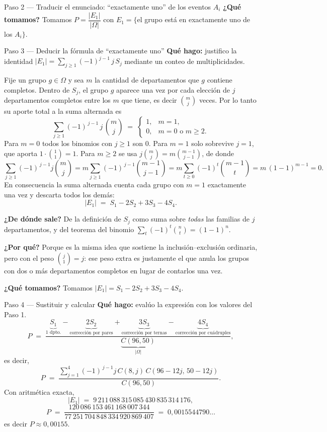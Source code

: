 \documentclass[11pt]{article}
\begin{document}
\begin{sol}
\begin{paso}{Paso 2 --- Traducir el enunciado: ``exactamente uno'' de los eventos $A_i$}
\textbf{¿Qu\'e tomamos?} Tomamos $P=\dfrac{|E_1|}{|\Omega|}$ con $E_1=\{$el grupo est\'a en exactamente uno de los $A_i\}$.
\end{paso}

\begin{paso}{Paso 3 --- Deducir la f\'ormula de ``exactamente uno''}
\textbf{Qu\'e hago:} justifico la identidad $|E_1|=\sum_{j\ge 1}(-1)^{j-1}\,j\,S_j$ mediante un conteo de multiplicidades.

Fije un grupo $g\in\Omega$ y sea $m$ la cantidad de departamentos que $g$ contiene completos. Dentro de $S_j$, el grupo $g$ aparece una vez por cada elecci\'on de $j$ departamentos completos entre los $m$ que tiene, es decir $\binom{m}{j}$ veces. Por lo tanto su aporte total a la suma alternada es
\[
\sum_{j\ge 1}(-1)^{\,j-1}\,j\,\binom{m}{j}
\;=\;\begin{cases} 1, & m=1,\\[2pt] 0, & m=0 \text{ o } m\ge 2.\end{cases}
\]
Para $m=0$ todos los binomios con $j\ge1$ son $0$. Para $m=1$ solo sobrevive $j=1$, que aporta $1\cdot\binom{1}{1}=1$. Para $m\ge 2$ se usa $j\binom{m}{j}=m\binom{m-1}{j-1}$, de donde
\[
\sum_{j\ge 1}(-1)^{\,j-1}j\binom{m}{j}=m\sum_{j\ge 1}(-1)^{\,j-1}\binom{m-1}{j-1}=m\sum_{t\ge 0}(-1)^{t}\binom{m-1}{t}=m\,(1-1)^{m-1}=0 .
\]
En consecuencia la suma alternada cuenta cada grupo con $m=1$ exactamente una vez y descarta todos los dem\'as:
\[
|E_1| \;=\; S_1-2S_2+3S_3-4S_4 .
\]

\textbf{¿De d\'onde sale?} De la definici\'on de $S_j$ como suma sobre \emph{todas} las familias de $j$ departamentos, y del teorema del binomio $\sum_t(-1)^t\binom{n}{t}=(1-1)^n$.

\textbf{¿Por qu\'e?} Porque es la misma idea que sostiene la inclusi\'on--exclusi\'on ordinaria, pero con el peso $\binom{j}{1}=j$: ese peso extra es justamente el que anula los grupos con dos o m\'as departamentos completos en lugar de contarlos una vez.

\textbf{¿Qu\'e tomamos?} Tomamos $|E_1|=S_1-2S_2+3S_3-4S_4$.
\end{paso}

\begin{paso}{Paso 4 --- Sustituir y calcular}
\textbf{Qu\'e hago:} evalúo la expresi\'on con los valores del Paso 1.
\[
P \;=\;\frac{\underbrace{S_1}_{\text{1 dpto.}}-\underbrace{2S_2}_{\text{correcci\'on por pares}}+\underbrace{3S_3}_{\text{correcci\'on por ternas}}-\underbrace{4S_4}_{\text{correcci\'on por cu\'adruples}}}{\underbrace{C(96,50)}_{|\Omega|}} ,
\]
es decir,
\[
P \;=\;\frac{\displaystyle\sum_{j=1}^{4}(-1)^{\,j-1}j\,C(8,j)\,C(96-12j,\,50-12j)}{C(96,50)} .
\]
Con aritm\'etica exacta,
\[
|E_1| \;=\; 9\,211\,088\,315\,085\,430\,835\,314\,176 ,
\]
\[
P \;=\; \frac{120\,086\,153\,461\,168\,007\,344}{77\,251\,704\,848\,334\,920\,869\,407}\;=\;0{,}0015544790\ldots
\]
es decir $P\approx 0{,}00155$.


\end{paso}
\end{sol}
\end{document}

